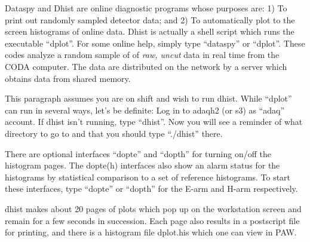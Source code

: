 Dataspy and Dhist are online diagnostic programs
whose purposes are: 
\hskip 0.05in 1) To print
out randomly sampled detector data; and
\hskip 0.05in 
2) To automatically plot to the screen
histograms of online data.
\hskip 0.05in 
Dhist is actually a shell script which runs 
the executable ``dplot''.  
For some online help, simply type
``dataspy'' or ``dplot''.
These codes analyze a random sample of
of {\it raw, uncut} data
in real time from the CODA computer.
The data are distributed on the network by
a server which obtains data from shared memory.

\par 
This paragraph assumes you are on shift
and wish to run dhist.  
While ``dplot'' can run in
several ways, let's be definite:  Log in to
adaqh2 (or s3) as ``adaq'' account.  If dhist
isn't running, type ``dhist''.  Now you will
see a reminder of what directory to go to and
that you should type ``./dhist'' there.

\par 
There are optional interfaces ``dopte'' and 
``dopth'' for turning on/off the histogram
pages.  The dopte(h) interfaces also show an 
alarm status for the histograms by statistical
comparison to a set of reference histograms.
To start these interfaces, type ``dopte'' or
``dopth'' for the E-arm and H-arm respectively.

\par 
dhist makes about 20 pages of plots which pop
up on the workstation screen and remain for
a few seconds in succession.  Each page also
results in a postscript file for printing, and
there is a histogram file dplot.his which one
can view in PAW.    

%
%
%
